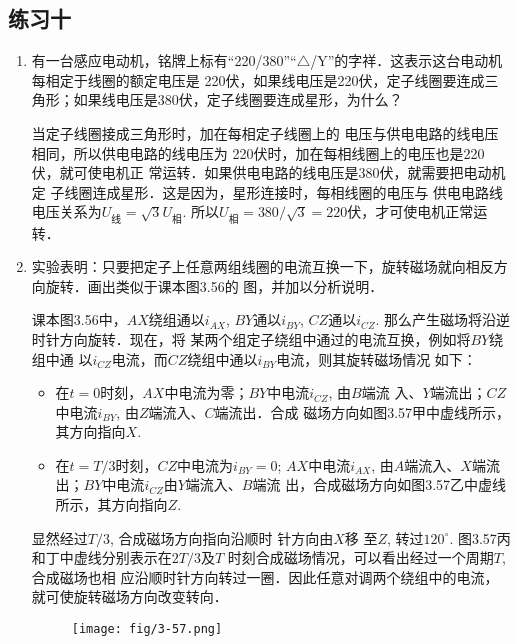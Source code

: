 \subsection{练习十}
\begin{enumerate}
    \item 有一台感应电动机，铭牌上标有“220/380”“$\triangle$/Y”的字祥．这表示这台电动机每相定于线圈的额定电压是 220伏，如果线电压是220伏，定子线圈要连成三角形；如果线电压是380伏，定子线圈要连成星形，为什么？


    \begin{solution}
当定子线圈接成三角形时，加在每相定子线圈上的
电压与供电电路的线电压相同，所以供电电路的线电压为
220伏时，加在每相线圈上的电压也是220伏，就可使电机正
常运转．如果供电电路的线电压是380伏，就需要把电动机定
子线圈连成星形．这是因为，星形连接时，每相线圈的电压与
供电电路线电压关系为$U_{\text{线}}=\sqrt{3}U_{\text{相}}$. 所以$U_{\text{相}}=380/\sqrt{3}=220$伏，才可使电机正常运转．
    \end{solution}
    
    \item 实验表明：只要把定子上任意两组线圈的电流互换一下，旋转磁场就向相反方向旋转．画出类似于课本图3.56的
    图，并加以分析说明．


    \begin{solution}
    课本图3.56中，$AX$绕组通以$i_{AX}$, $BY$通以$i_{BY}$,
$CZ$通以$i_{CZ}$. 那么产生磁场将沿逆时针方向旋转．现在，将
某两个组定子绕组中通过的电流互换，例如将$BY$绕组中通
以$i_{CZ}$电流，而$CZ$绕组中通以$i_{BY}$电流，则其旋转磁场情况
如下：
\begin{itemize}
\item 在$t=0$时刻，$AX$中电流为零；$BY$中电流$i_{CZ}$, 由$B$端流
入、$Y$端流出；$CZ$中电流$i_{BY}$, 由$Z$端流入、$C$端流出．合成
磁场方向如图3.57甲中虚线所示，其方向指向$X$.

\item 在$t=T/3$时刻，$CZ$中电流为$i_{BY}=0$; $AX$中电流$i_{AX}$, 
由$A$端流入、$X$端流出；$BY$中电流$i_{CZ}$由$Y$端流入、$B$端流
出，合成磁场方向如图3.57乙中虚线所示，其方向指向$Z$.
\end{itemize}

显然经过$T/3$, 合成磁场方向指向沿顺时 针方向由$X$移
至$Z$, 转过$120^{\circ}$. 图3.57丙和丁中虚线分别表示在$2T/3$及$T$
时刻合成磁场情况，可以看出经过一个周期$T$, 合成磁场也相
应沿顺时针方向转过一圈．因此任意对调两个绕组中的电流，
就可使旋转磁场方向改变转向．
\begin{figure}[htp]
    \centering
    \texttt{[image: fig/3-57.png]}
    \caption{}
\end{figure}
    \end{solution}
    

\end{enumerate}
